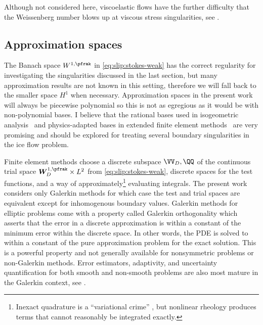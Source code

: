 Although not considered here, viscoelastic flows have the further difficulty that the Weissenberg number blows up at viscous stress singularities, see \citet{lipscomb1987implications,davies1988reentrant,hinch1993flow,owens2002cr}.

\subsection{Approximation spaces}\label{sssec:approximation}
The Banach space $W^{1,\pfrak}$ in \eqref{eq:slip:stokes-weak} has the correct regularity for investigating the singularities discussed in the last section, but many approximation results are not known in this setting, therefore we will fall back to the smaller space $H^1$ when necessary.
Approximation spaces in the present work will always be piecewise polynomial so this is not as egregious as it would be with non-polynomial bases.
I believe that the rational bases used in isogeometric analysis~\citep{hughes2005isogeometric,cottrell2009isogeometric} and physics-adapted bases in extended finite element methods~\citep{belytschko2009review,mohammadi2008extended,elguedj2006extended} are very promising and should be explored for treating several boundary singularities in the ice flow problem.

Finite element methods choose a discrete subspace $\VV_D,\QQ$ of the continuous trial space $\bm W_D^{1,\pfrak} \times L^2$ from \eqref{eq:slip:stokes-weak}, discrete spaces for the test functions, and a way of approximately\footnote{Inexact quadrature is a ``variational crime'' \citep{brenner2008mathematical}, but nonlinear rheology produces terms that cannot reasonably be integrated exactly.} evaluating integrals.
The present work considers only Galerkin methods for which case the test and trial spaces are equivalent except for inhomogenous boundary values.
Galerkin methods for elliptic problems come with a property called Galerkin orthogonality which asserts that the error in a discrete approximation is within a constant of the minimum error within the discrete space.
In other words, the PDE is solved to within a constant of the pure approximation problem for the exact solution.
This is a powerful property and not generally available for nonsymmetric problems or non-Galerkin methods.
Error estimators, adaptivity, and uncertainty quantification for both smooth and non-smooth problems are also most mature in the Galerkin context, see \citet{ainsworth1997pee,matthies2005gml,babuska2005scm,barth2010mlmcfe}.

